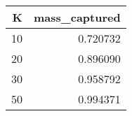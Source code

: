 \begin{tabular}{rr}
\toprule
K & mass_captured \\
\midrule
10 & 0.720732 \\
20 & 0.896090 \\
30 & 0.958792 \\
50 & 0.994371 \\
\bottomrule
\end{tabular}
